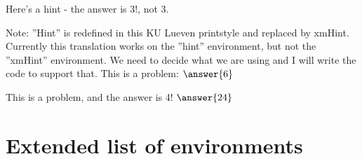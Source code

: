 \documentclass{ximera}
\begin{document}
        \begin{exercise}
            \begin{hint}
                Here's a hint - the answer is 3!, not 3.
            \end{hint}
            Note: ''Hint'' is redefined in this KU Lueven printstyle and replaced by xmHint. Currently this translation works on the ''hint'' environment, but not the ''xmHint'' environment. We need to decide what we are using and I will write the code to support that.
            This is a problem: $\answer{6}$
        \end{exercise}
            
        \begin{exploration}
            This is a problem, and the answer is 4! $\answer{24}$
        \end{exploration}


\section*{Extended list of environments}%
\end{document}
